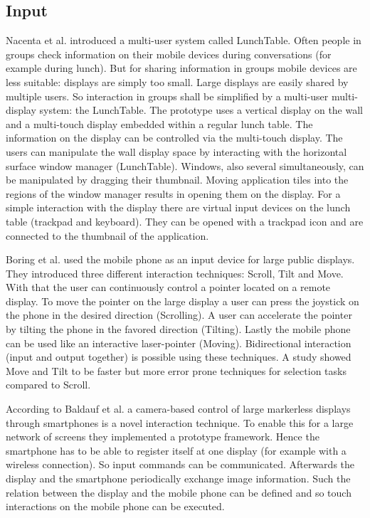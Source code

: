 \subsection{Input}
Nacenta et al. \cite{a18-nacenta} introduced a multi-user system called LunchTable.
Often people in groups check information on their mobile devices during conversations (for example during lunch). But for sharing information in groups mobile devices are less suitable: displays are simply too small.
Large displays are easily shared by multiple users. So interaction in groups shall be simplified by a multi-user multi-display system: the LunchTable.
The prototype uses a vertical display on the wall and a multi-touch display embedded within a regular lunch table.
The information on the display can be controlled via the multi-touch display.
The users can manipulate the wall display space by interacting with the horizontal surface window manager (LunchTable).
Windows, also several simultaneously, can be manipulated by dragging their thumbnail. Moving application tiles into the regions of the window manager results in opening them on the display.
For a simple interaction with the display there are virtual input devices on the lunch table (trackpad and keyboard).
They can be opened with a trackpad icon and are connected to the thumbnail of the application.

Boring et al. \cite{p161-boring} used the mobile phone as an input device for large public displays.
They introduced three different interaction techniques: Scroll, Tilt and Move. With that the user can continuously control a pointer located on a remote display.
To move the pointer on the large display a user can press the joystick on the phone in the desired direction (Scrolling).
A user can accelerate the pointer by tilting the phone in the favored direction (Tilting).
Lastly the mobile phone can be used like an interactive laser-pointer (Moving).
Bidirectional interaction (input and output together) is possible using these techniques.
A study showed Move and Tilt to be faster but more error prone techniques for selection tasks compared to Scroll.

According to Baldauf et al. \cite{a4-baldauf} a camera-based control of large markerless displays through smartphones is a novel interaction technique.
To enable this for a large network of screens they implemented a prototype framework.
Hence the smartphone has to be able to register itself at one display (for example with a wireless connection).
So input commands can be communicated.
Afterwards the display and the smartphone periodically exchange image information.
Such the relation between the display and the mobile phone can be defined and so touch interactions on the mobile phone can be executed.


